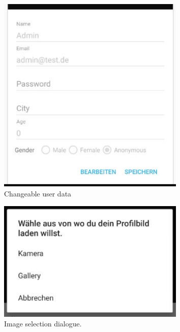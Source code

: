 \begin{figure}[htbp]
	\includegraphics[width=0.8\textwidth]{images/profile_fragment_two.jpg}
	\centering
	\caption{Changeable user data}\label{fig:profile_fragment_two}
\end{figure}
\begin{figure}[htbp]
	\includegraphics[width=0.8\textwidth]{images/profile_image_selection.jpg}
	\centering
	\caption{Image selection dialogue.}\label{fig:profile_image_selection}
\end{figure}

